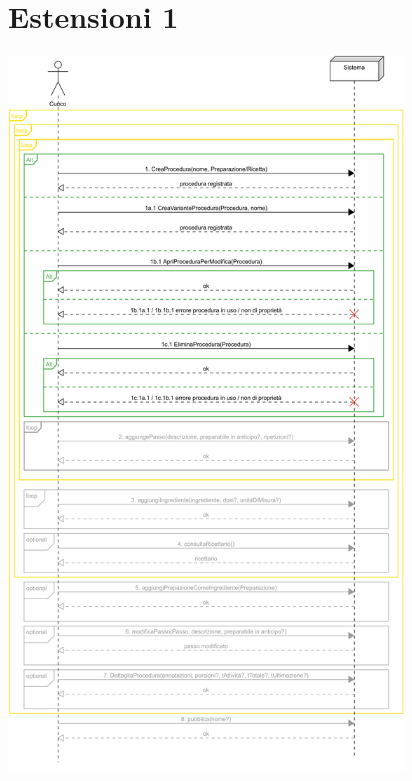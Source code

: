 \section*{Estensioni 1}
\includegraphics[max width=\textwidth, max height=190mm]{../resources/img/GRP/SSD/ext1.png}

